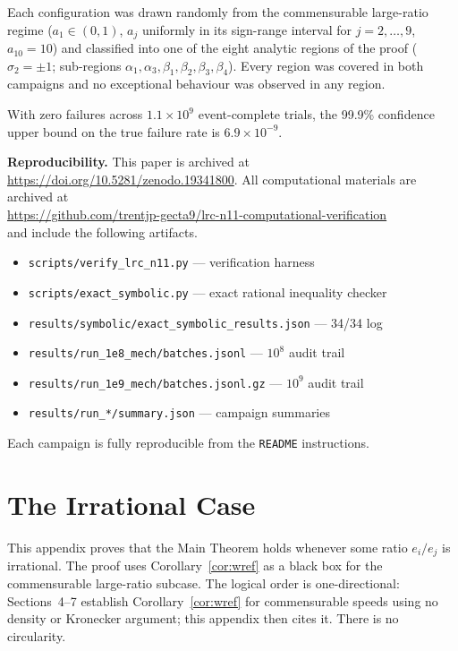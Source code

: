 \documentclass[12pt,a4paper]{amsart}
\theoremstyle{definition}
\theoremstyle{remark}
\begin{document}
Each configuration was drawn randomly from the commensurable large-ratio regime
($a_1\in(0,1)$, $a_j$ uniformly in its sign-range interval for $j=2,\ldots,9$,
$a_{10}=10$) and classified into one of the eight analytic regions of the proof
($\sigma_2=\pm1$; sub-regions $\alpha_1,\alpha_3,\beta_1,\beta_2,\beta_3,\beta_4$).
Every region was covered in both campaigns and no exceptional behaviour was observed
in any region.

With zero failures across $1.1\times10^{9}$ event-complete trials, the 99.9\%
confidence upper bound on the true failure rate is $6.9\times10^{-9}$.

\medskip
\noindent\textbf{Reproducibility.}
This paper is archived at \url{https://doi.org/10.5281/zenodo.19341800}.
All computational materials are archived at\\
\url{https://github.com/trentjp-gecta9/lrc-n11-computational-verification}\\
and include the following artifacts.
\begin{itemize}\setlength{\itemsep}{1pt}
  \item \texttt{scripts/verify\_lrc\_n11.py} --- verification harness
  \item \texttt{scripts/exact\_symbolic.py} --- exact rational inequality checker
  \item \texttt{results/symbolic/exact\_symbolic\_results.json} --- 34/34 log
  \item \texttt{results/run\_1e8\_mech/batches.jsonl} --- $10^8$ audit trail
  \item \texttt{results/run\_1e9\_mech/batches.jsonl.gz} --- $10^9$ audit trail
  \item \texttt{results/run\_*/summary.json} --- campaign summaries
\end{itemize}
Each campaign is fully reproducible from the \texttt{README} instructions.

\section{The Irrational Case}\label{app:irrational}

This appendix proves that the Main Theorem holds whenever some ratio $e_i/e_j$ is
irrational. The proof uses Corollary~\ref{cor:wref} as a black box for the commensurable
large-ratio subcase. The logical order is one-directional: Sections~4--7 establish
Corollary~\ref{cor:wref} for commensurable speeds using no density or Kronecker argument;
this appendix then cites it. There is no circularity.
\end{document}
